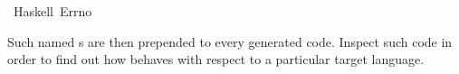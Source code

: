 \begin{isabellebody}
\isanewline
{}\isamarkupfalse%
\ Haskell\ Errno%
\endisatagquotett
{\isafoldquotett}%
%
\isadelimquotett
%
\endisadelimquotett
%
\begin{isamarkuptext}%
\noindent Such named s are then prepended to every
  generated code.  Inspect such code in order to find out how
  \hyperlink{command.code-include}{\mbox{}} behaves with respect to a particular
  target language.%
\end{isamarkuptext}%
\isamarkuptrue%
%
\isadelimtheory
%
\endisadelimtheory
%
\isatagtheory
{}\isamarkupfalse%
%
\endisatagtheory
{\isafoldtheory}%
%
\isadelimtheory
%
\endisadelimtheory
\isanewline
\end{isabellebody}%
